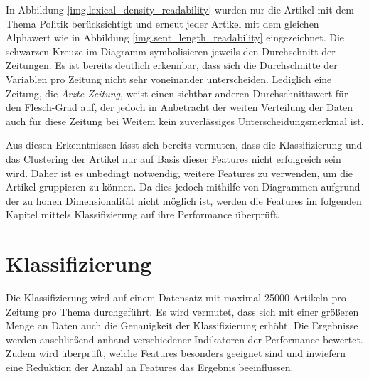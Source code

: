 

In Abbildung \ref{img.lexical_density_readability} wurden nur die Artikel mit dem Thema Politik berücksichtigt und erneut jeder Artikel mit dem gleichen Alphawert wie in Abbildung \ref{img.sent_length_readability} eingezeichnet. Die schwarzen Kreuze im Diagramm symbolisieren jeweils den Durchschnitt der Zeitungen. Es ist bereits deutlich erkennbar, dass sich die Durchschnitte der Variablen pro Zeitung nicht sehr voneinander unterscheiden. Lediglich eine Zeitung, die \emph{Ärzte-Zeitung}, weist einen sichtbar anderen Durchschnittswert für den Flesch-Grad auf, der jedoch in Anbetracht der weiten Verteilung der Daten auch für diese Zeitung bei Weitem kein zuverlässiges Unterscheidungsmerkmal ist.

Aus diesen Erkenntnissen lässt sich bereits vermuten, dass die Klassifizierung und das Clustering der Artikel nur auf Basis dieser Features nicht erfolgreich sein wird. Daher ist es unbedingt notwendig, weitere Features zu verwenden, um die Artikel gruppieren zu können. Da dies jedoch mithilfe von Diagrammen aufgrund der zu hohen Dimensionalität nicht möglich ist, werden die Features im folgenden Kapitel mittels Klassifizierung auf ihre Performance überprüft.

\section{Klassifizierung}
Die Klassifizierung wird auf einem Datensatz mit maximal 25000 Artikeln pro Zeitung pro Thema durchgeführt. Es wird vermutet, dass sich mit einer größeren Menge an Daten auch die Genauigkeit der Klassifizierung erhöht. Die Ergebnisse werden anschließend anhand verschiedener Indikatoren der Performance bewertet. Zudem wird überprüft, welche Features besonders geeignet sind und inwiefern eine Reduktion der Anzahl an Features das Ergebnis beeinflussen.

